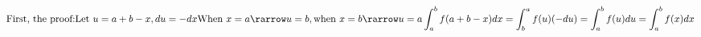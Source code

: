 \documentclass[preview]{standalone}
\begin{document}
\begin{align*}
\text{First, the proof:} \text{Let } u = a + b - x, du = -dx \text{When } x = a \rarrow u = b, \text{when } x = b \rarrow u = a \int_{a}^{b} f(a+b-x)dx = \int_{b}^{a} f(u)(-du) = \int_{a}^{b} f(u) du = \int_{a}^{b} f(x) dx
\end{align*}
\end{document}
